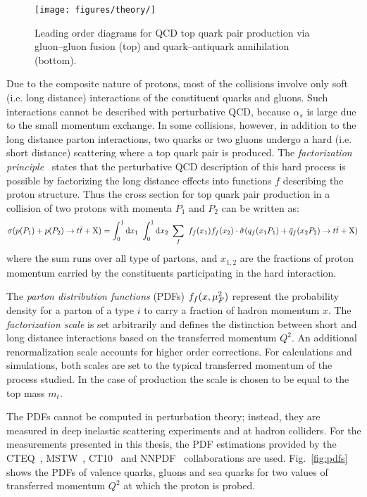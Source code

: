 \begin{figure}[!htb]\centering
  \texttt{[image: figures/theory/]}
  \caption{Leading order diagrams for QCD top quark pair production
    via gluon--gluon fusion (top) and quark--antiquark annihilation (bottom).}
  \label{fig:ttbarprod}
\end{figure}

Due to the composite nature of protons, most of the
collisions involve only soft (i.e. long distance) interactions of the
constituent quarks and gluons. Such interactions cannot be described
with perturbative QCD, because $\alpha_s$ is large due to the small
momentum exchange. In some collisions, however, in addition to the
long distance parton interactions, two quarks or two gluons undergo a
hard (i.e. short distance) scattering where a top quark pair is produced.
The {\it factorization principle}~\cite{factorprinciple} states that
the perturbative QCD description of this hard process is possible by
factorizing the long distance effects into functions $f$ describing the
proton structure. Thus the cross section for top quark pair
production in a collision of two protons with momenta $P_1$ and $P_2$
can be written as: 
\begin{equation}
  \sigma(p(P_1)+p(P_2)\to\mbox{$t\bar{t}$}{}+{\rm X})
  = 
  \int_0^1{\rm d}x_1
  ~\int_0^1{\rm d}x_2
  ~\sum_f~ f_f(x_1) f_f(x_2)
  \cdot{}\hat{\sigma}(q_f(x_1P_1)+\bar{q}_f(x_2P_2)\to\mbox{$t\bar{t}$}{}+{\rm
    X})
  \phantom{,}
  \label{eq:ttbarxs}
\end{equation}
where the sum runs over all type of partons, and $x_{1,2}$ are the
fractions of proton momentum carried by the constituents participating
in the hard interaction. 

The {\it parton distribution functions} (PDFs) $f_f(x,\mu_F^2{})$
represent the probability density for a parton of a type $i$ to carry
a fraction of hadron momentum $x$. The {\it factorization scale}
\factscale{} is set arbitrarily and defines the distinction between
short and long distance interactions based on the transferred momentum
$Q^2$. An additional renormalization scale \renormscale{} accounts for higher
order corrections. For calculations and simulations, both scales are
set to the typical transferred momentum of the process studied. In the case of
\ttbar{} production the scale is chosen to be equal to the top mass $m_t$.
  
The PDFs cannot be computed in perturbation theory; instead, they are
measured in deep inelastic scattering experiments and at hadron colliders.
For the measurements presented in this thesis, the PDF estimations
provided by the CTEQ~\cite{cteq}, MSTW~\cite{mstw}, CT10~\cite{ct10}
and NNPDF~\cite{nnpdf} collaborations are used. Fig.~\ref{fig:pdfs}
shows the PDFs of valence quarks, gluons and sea quarks for two values
of transferred momentum $Q^2$ at which the proton is probed. 

